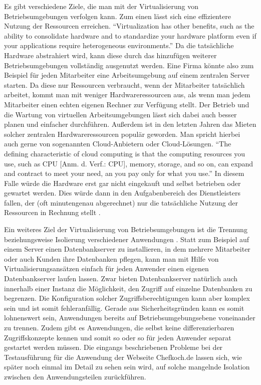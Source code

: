Es gibt verschiedene Ziele, die man mit der Virtualisierung von Betriebsumgebungen verfolgen kann. Zum einen lässt sich eine effizientere Nutzung der Ressourcen erreichen. "`Virtualization has other benefits, such as the ability to consolidate hardware and to standardize your hardware platform even if your applications require heterogeneous environments."' \citep[S.][S. 53]{HumFar10} Da die tatsächliche Hardware abstrahiert wird, kann diese durch das hinzufügen weiterer Betriebsumgebungen vollständig ausgenutzt werden. Eine Firma könnte also zum Beispiel für jeden Mitarbeiter eine Arbeitsumgebung auf einem zentralen Server starten. Da diese nur Ressourcen verbraucht, wenn der Mitarbeiter tatsächlich arbeitet, kommt man mit weniger Hardwareressourcen aus, als wenn man jedem Mitarbeiter einen echten eigenen Rechner zur Verfügung stellt. Der Betrieb und die Wartung von virtuellen Arbeitsumgebungen lässt sich dabei auch besser planen und einfacher durchführen. Außerdem ist in den letzten Jahren das Mieten solcher zentralen Hardwareressourcen populär geworden. Man spricht hierbei auch gerne von sogenannten Cloud-Anbietern oder Cloud-Lösungen. "`The defining characteristic of cloud computing is that the computing resources you use, such as CPU [Anm. d. Verf.: \acl{CPU}], memory, storage, and so on, can expand and contract to meet your need, an you pay only for what you use."' \citep[S.][S. 312]{HumFar10} In diesem Falle würde die Hardware erst gar nicht eingekauft und selbst betrieben oder gewartet werden. Dies würde dann in den Aufgabenbereich des Dienstleisters fallen, der (oft minutengenau abgerechnet) nur die tatsächliche Nutzung der Ressourcen in Rechnung stellt \citep[Vgl.][S. 7]{ZhaChe14}.

Ein weiteres Ziel der Virtualisierung von Betriebsumgebungen ist die Trennung beziehungsweise Isolierung verschiedener Anwendungen \citep[Vgl.][Abstract]{Schee14}. Statt zum Beispiel auf einem Server einen Datenbankserver zu installieren, in dem mehrere Mitarbeiter oder auch Kunden ihre Datenbanken pflegen, kann man mit Hilfe von Virtualisierungsansätzen einfach für jeden Anwender einen eigenen Datenbankserver laufen lassen. Zwar bieten Datenbankserver natürlich auch innerhalb einer Instanz die Möglichkeit, den Zugriff auf einzelne Datenbanken zu begrenzen. Die Konfiguration solcher Zugriffsberechtigungen kann aber komplex sein und ist somit fehleranfällig. Gerade aus Sicherheitsgründen kann es somit lohnenswert sein, Anwendungen bereits auf Betriebsumgebungsebene voneinander zu trennen. Zudem gibt es Anwendungen, die selbst keine differenzierbaren Zugriffskonzepte kennen und somit so oder so für jeden Anwender separat gestartet werden müssen. Die eingangs beschriebenen Probleme bei der Testausführung für die Anwendung der Webseite Chefkoch.de lassen sich, wie später noch einmal im Detail zu sehen sein wird, auf solche mangelnde Isolation zwischen den Anwendungsteilen zurückführen.

